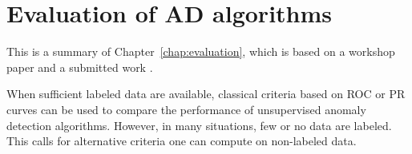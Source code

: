 




\section{Evaluation of AD algorithms}
\label{resume:evaluation}
This is a summary of Chapter~\ref{chap:evaluation}, which is based on a workshop paper \citep{ICMLworkshop16} and a submitted work \citep{NIPS16evaluation}.


When sufficient labeled data are available, classical criteria based on ROC or PR curves can be used to compare the performance of unsupervised anomaly detection algorithms. However, in many situations, few or no data are labeled. This calls for alternative criteria one can compute on non-labeled data.

